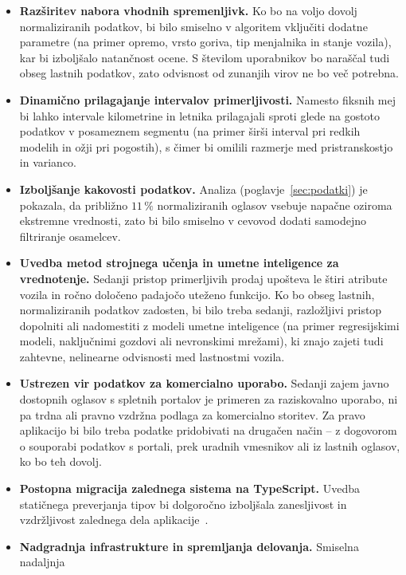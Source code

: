\documentclass[a4paper,12pt,openright]{book}
\begin{document}
\begin{itemize}
    \item \textbf{Razširitev nabora vhodnih spremenljivk.} Ko bo na voljo dovolj
    normaliziranih podatkov, bi bilo smiselno v algoritem vključiti dodatne parametre
    (na primer opremo, vrsto goriva, tip menjalnika in stanje vozila), kar bi izboljšalo
    natančnost ocene. S številom uporabnikov bo naraščal tudi obseg lastnih podatkov, zato
    odvisnost od zunanjih virov ne bo več potrebna.
    \item \textbf{Dinamično prilagajanje intervalov primerljivosti.} Namesto fiksnih mej bi
    lahko intervale kilometrine in letnika prilagajali sproti glede na gostoto podatkov v
    posameznem segmentu (na primer širši interval pri redkih modelih in ožji pri pogostih),
    s čimer bi omilili razmerje med pristranskostjo in varianco.
    \item \textbf{Izboljšanje kakovosti podatkov.} Analiza (poglavje~\ref{sec:podatki}) je
    pokazala, da približno $11\,\%$ normaliziranih oglasov vsebuje napačne oziroma ekstremne vrednosti,
    zato bi bilo smiselno v cevovod dodati samodejno filtriranje osamelcev.
    \item \textbf{Uvedba metod strojnega učenja in umetne inteligence za vrednotenje.}
    Sedanji pristop primerljivih prodaj upošteva le štiri atribute vozila in ročno določeno
    padajočo uteženo funkcijo. Ko bo obseg lastnih, normaliziranih podatkov
    zadosten, bi bilo treba sedanji, razložljivi pristop dopolniti ali nadomestiti z
    modeli umetne inteligence (na primer regresijskimi modeli, naključnimi gozdovi ali
    nevronskimi mrežami), ki znajo zajeti tudi zahtevne, nelinearne odvisnosti med
    lastnostmi vozila.
    \item \textbf{Ustrezen vir podatkov za komercialno uporabo.} Sedanji zajem javno dostopnih
    oglasov s spletnih portalov je primeren za raziskovalno uporabo, ni pa trdna ali pravno
    vzdržna podlaga za komercialno storitev. Za pravo aplikacijo bi bilo treba podatke
    pridobivati na drugačen način -- z dogovorom o souporabi podatkov s portali, prek
    uradnih vmesnikov ali iz lastnih oglasov, ko bo teh dovolj.
    \item \textbf{Postopna migracija zalednega sistema na TypeScript.} Uvedba statičnega
    preverjanja tipov bi dolgoročno izboljšala zanesljivost in vzdržljivost zalednega dela
    aplikacije~\cite{gao2017typescript}.
    \item \textbf{Nadgradnja infrastrukture in spremljanja delovanja.} Smiselna nadaljnja

\end{itemize}
\end{document}
